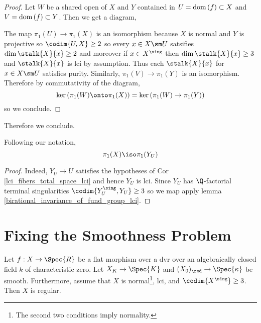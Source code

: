 \documentclass[12pt]{article}
\begin{document}
\begin{proof}
Let $W$ be a shared open of $X$ and $Y$ contained in $U = \mathrm{dom} \left( f \right) \subset X$ and $V = \mathrm{dom} \left( f \right) \subset Y$. Then we get a diagram,
\begin{center}
\end{center}
The map $\pi_1(U) \to \pi_1(X)$ is an isomorphism because $X$ is normal and $Y$ is projective so $\codim{U, X} \ge 2$ so every $x \in X \sm U$ satsifies $\dim{\stalk{X}{x}} \ge 2$ and moreover if $x \in X^{\sing}$ then $\dim{\stalk{X}{x}} \ge 3$ and $\stalk{X}{x}$ is lci by assumption. Thus each $\stalk{X}{x}$ for $x \in X \sm U$ satisfies purity. Similarly, $\pi_1(V) \to \pi_1(Y)$ is an isomorphism. Therefore by commutativity of the diagram,
\[ \ker{(\pi_1(W) \onto \pi_1(X))} = \ker{(\pi_1(W) \to \pi_1(Y))} \]
so we conclude.
\end{proof}

Therefore we conclude.

\begin{prop}
Following our notation, 
\[ \pi_1(X) \iso \pi_1(Y_U) \]
\end{prop}

\begin{proof}
Indeed, $Y_U \to U$ satisfies the hypotheses of Cor \ref{lci_fibers_total_space_lci} and hence $Y_U$ is lci. Since $Y_U$ has $\Q$-factorial terminal singularities $\codim{Y_U^{\sing}, Y_U} \ge 3$ so we map apply lemma \ref{birational_invariance_of_fund_group_lci}. 
\end{proof}

\section{Fixing the Smoothness Problem}


\begin{prop}
Let $f : X \to \Spec{R}$ be a flat morphism over a dvr over an algebraically closed field $k$ of characteristic zero. Let $X_K \to \Spec{K}$ and $(X_0)_{\red} \to \Spec{\kappa}$ be smooth. Furthermore, assume that $X$ is normal\footnote{The second two conditions imply normality.}, lci, and $\codim{X^{\sing}} \ge 3$. Then $X$ is regular.
\end{prop}
\end{document}
